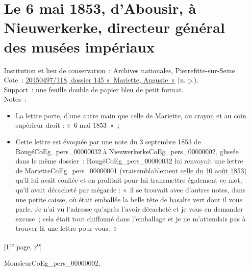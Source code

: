 \documentclass{book}
\begin{document}
\hypertarget{CoEg_Mariette_1853-05-06}{}
\section*{Le 6 mai 1853, d’Abousir, à Nieuwerkerke, directeur général des musées impériaux}
{\footnotesize
\noindent Institution et lieu de conservation~: Archives nationales, Pierrefitte-sur-Seine\\
Cote~: \hyperlink{CoEg_Mariette_ms_001}{20150497/118, dossier 145 «~Mariette, Auguste~»} (n. p.).\\
Support~: une feuille double de papier bleu de petit format.\\
Notes~: \begin{itemize} \item La lettre porte, d’une autre main que celle de Mariette, au crayon et au coin supérieur droit : «~6 mai 1853~»~; \item Cette lettre est évoquée par une note du 3 septembre 1853 de Rougé\gls{CoEg_pers_00000032} à Nieuwerkerke\gls{CoEg_pers_00000002}, glissée dans le même dossier~: Rougé\gls{CoEg_pers_00000032} lui renvoyait une lettre de Mariette\gls{CoEg_pers_00000001} (vraisemblablement \hyperlink{CoEg_Mariette_1853-08-10}{celle du 10 août 1853}) qu'il lui avait confiée et en profitait pour lui transmettre également ce mot, qu'il avait décacheté par mégarde : «~il se trouvait avec d’autres notes, dans une petite caisse, où était emballée la belle tête de basalte vert dont il vous parle. Je n’ai vu l’adresse qu’après l’avoir décacheté et je vous en demander excuse~; cela était tout chiffonné dans l’emballage et je ne m’attendais pas à trouver là une lettre pour vous.~» \end{itemize}
\begin{center} {[1\textsuperscript{re} page, r\textsuperscript{o}]}\end{center}}

\hspace{1cm} Monsieur\gls{CoEg_pers_00000002},\\
\end{document}
